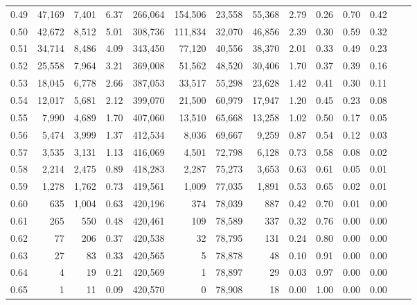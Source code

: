 \begin{tabular}{rrrrrrrrrrrrrr}
0.49 &  47,169 &  7,401 &    6.37 &  266,064 &  154,506 &  23,558 &  55,368 &  2.79 &  0.26 &  0.70 &      0.42 \\
0.50 &  42,672 &  8,512 &    5.01 &  308,736 &  111,834 &  32,070 &  46,856 &  2.39 &  0.30 &  0.59 &      0.32 \\
0.51 &  34,714 &  8,486 &    4.09 &  343,450 &   77,120 &  40,556 &  38,370 &  2.01 &  0.33 &  0.49 &      0.23 \\
0.52 &  25,558 &  7,964 &    3.21 &  369,008 &   51,562 &  48,520 &  30,406 &  1.70 &  0.37 &  0.39 &      0.16 \\
0.53 &  18,045 &  6,778 &    2.66 &  387,053 &   33,517 &  55,298 &  23,628 &  1.42 &  0.41 &  0.30 &      0.11 \\
0.54 &  12,017 &  5,681 &    2.12 &  399,070 &   21,500 &  60,979 &  17,947 &  1.20 &  0.45 &  0.23 &      0.08 \\
0.55 &   7,990 &  4,689 &    1.70 &  407,060 &   13,510 &  65,668 &  13,258 &  1.02 &  0.50 &  0.17 &      0.05 \\
0.56 &   5,474 &  3,999 &    1.37 &  412,534 &    8,036 &  69,667 &   9,259 &  0.87 &  0.54 &  0.12 &      0.03 \\
0.57 &   3,535 &  3,131 &    1.13 &  416,069 &    4,501 &  72,798 &   6,128 &  0.73 &  0.58 &  0.08 &      0.02 \\
0.58 &   2,214 &  2,475 &    0.89 &  418,283 &    2,287 &  75,273 &   3,653 &  0.63 &  0.61 &  0.05 &      0.01 \\
0.59 &   1,278 &  1,762 &    0.73 &  419,561 &    1,009 &  77,035 &   1,891 &  0.53 &  0.65 &  0.02 &      0.01 \\
0.60 &     635 &  1,004 &    0.63 &  420,196 &      374 &  78,039 &     887 &  0.42 &  0.70 &  0.01 &      0.00 \\
0.61 &     265 &    550 &    0.48 &  420,461 &      109 &  78,589 &     337 &  0.32 &  0.76 &  0.00 &      0.00 \\
0.62 &      77 &    206 &    0.37 &  420,538 &       32 &  78,795 &     131 &  0.24 &  0.80 &  0.00 &      0.00 \\
0.63 &      27 &     83 &    0.33 &  420,565 &        5 &  78,878 &      48 &  0.10 &  0.91 &  0.00 &      0.00 \\
0.64 &       4 &     19 &    0.21 &  420,569 &        1 &  78,897 &      29 &  0.03 &  0.97 &  0.00 &      0.00 \\
0.65 &       1 &     11 &    0.09 &  420,570 &        0 &  78,908 &      18 &  0.00 &  1.00 &  0.00 &      0.00 \\

\end{tabular}
